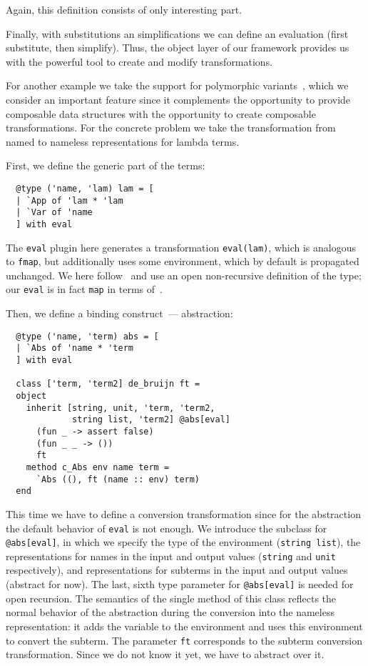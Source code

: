 \documentclass[twocolumn,8pt]{extarticle}
\newcommand{\cd}[1]{\texttt{#1}}
\begin{document}
Again, this definition consists of only interesting part.

Finally, with substitutions an simplifications we can define an evaluation (first substitute, then simplify). Thus, the object layer of our framework
provides us with the powerful tool to create and modify transformations.

For another example we take the support for polymorphic variants~\cite{PolyVar,PolyVarReuse}, which we consider an important feature since it complements
the opportunity to provide composable data structures with the opportunity to create composable transformations. For the concrete problem we take the
transformation from named to nameless representations for lambda terms.

First, we define the generic part of the terms:

\begin{lstlisting}
  @type ('name, 'lam) lam = [
  | `App of 'lam * 'lam
  | `Var of 'name
  ] with eval
\end{lstlisting}

The \cd{eval} plugin here generates a transformation \cd{eval(lam)}, which is analogous to \cd{fmap}, but additionally uses some environment, which
by default is propagated unchanged. We here follow~\cite{PolyVarReuse} and use an open non-recursive definition of the type; our \cd{eval} is
in fact \cd{map} in terms of~\cite{Visitors}.

Then, we define a binding construct~--- abstraction:

\begin{lstlisting}
  @type ('name, 'term) abs = [
  | `Abs of 'name * 'term
  ] with eval
  
  class ['term, 'term2] de_bruijn ft =
  object
    inherit [string, unit, 'term, 'term2,
             string list, 'term2] @abs[eval]
      (fun _ -> assert false)
      (fun _ _ -> ())
      ft
    method c_Abs env name term =
      `Abs ((), ft (name :: env) term)
  end
\end{lstlisting}

This time we have to define a conversion transformation since for the abstraction the default behavior of \cd{eval} is not
enough. We introduce the subclass for \cd{@abs[eval]}, in which we specify the type of the environment (\lstinline{string list}),
the representations for names in the input and output values (\lstinline{string} and \lstinline{unit} respectively), and
representations for subterms in the input and output values (abstract for now). The last, sixth type parameter for \cd{@abs[eval]}
is needed for open recursion. The semantics of the single method of this class reflects the normal behavior of the
abstraction during the conversion into the nameless representation: it adds the variable to the environment and uses this
environment to convert the subterm. The parameter \lstinline{ft} corresponds to the subterm conversion transformation. Since
we do not know it yet, we have to abstract over it.
\end{document}
